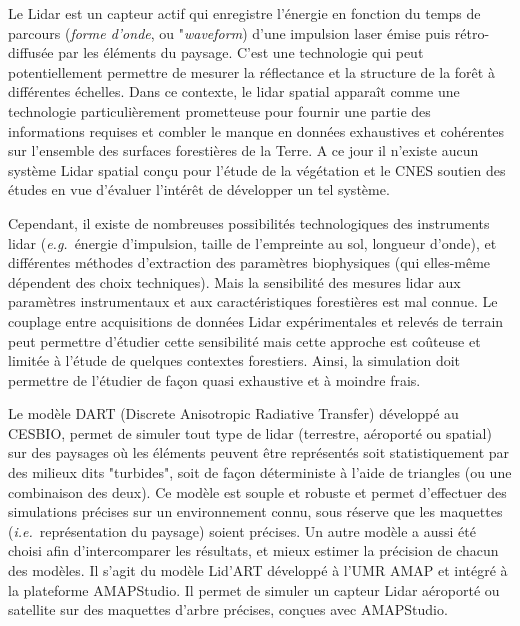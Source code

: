 \documentclass[a4paper,11pt]{article}
\newcommand{\ie}{\textit{i.e.}~}
\newcommand{\eg}{\textit{e.g.}~}
\begin{document}
Le Lidar est un capteur actif qui enregistre l'énergie en fonction du temps de parcours (\textit{forme d'onde}, ou "\textit{waveform}) d'une impulsion laser émise puis rétro-diffusée par les éléments du paysage. C'est une technologie qui peut potentiellement permettre de mesurer la réflectance et la structure de la forêt à différentes échelles. Dans ce contexte, le lidar spatial apparaît comme une technologie particulièrement prometteuse pour fournir une partie des informations requises et combler le manque en données exhaustives et cohérentes sur l'ensemble des surfaces forestières de la Terre. A ce jour il n'existe aucun système Lidar spatial conçu pour l'étude de la végétation et le CNES soutien des études en vue d'évaluer l'intérêt de développer un tel système. 


Cependant, il existe de nombreuses possibilités technologiques des instruments lidar (\eg énergie d'impulsion, taille de l'empreinte au sol, longueur d'onde), et différentes méthodes d'extraction des paramètres biophysiques (qui elles-même dépendent des choix techniques). Mais la sensibilité des mesures lidar aux paramètres instrumentaux et aux caractéristiques forestières est mal connue. Le couplage entre acquisitions de données Lidar expérimentales et relevés de terrain peut permettre d'étudier cette sensibilité mais cette approche est coûteuse et limitée à l'étude de quelques contextes forestiers. Ainsi, la simulation doit permettre de l'étudier de façon quasi exhaustive et à moindre frais. 


Le modèle DART (Discrete Anisotropic Radiative Transfer) développé au CESBIO, permet de simuler tout type de lidar (terrestre, aéroporté ou spatial) sur des paysages où les éléments peuvent être représentés soit statistiquement par des milieux dits "turbides", soit de façon déterministe à l'aide de triangles (ou une combinaison des deux). Ce modèle est souple et robuste et permet d'effectuer des simulations précises sur un environnement connu, sous réserve que les maquettes (\ie représentation du paysage) soient précises. Un autre modèle a aussi été choisi afin d'intercomparer les résultats, et mieux estimer la précision de chacun des modèles. Il s'agit du modèle Lid'ART développé à l'UMR AMAP et intégré à la plateforme AMAPStudio. Il permet de simuler un capteur Lidar aéroporté ou satellite sur des maquettes d'arbre précises, conçues avec AMAPStudio.
\end{document}
